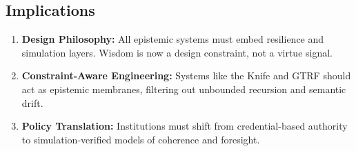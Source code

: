 \documentclass[12pt]{article}
\begin{document}
\subsection{Implications}
\begin{enumerate}
    \item \textbf{Design Philosophy:} All epistemic systems must embed resilience and simulation layers. Wisdom is now a design constraint, not a virtue signal.
    \item \textbf{Constraint-Aware Engineering:} Systems like the Knife and GTRF should act as epistemic membranes, filtering out unbounded recursion and semantic drift.
    \item \textbf{Policy Translation:} Institutions must shift from credential-based authority to simulation-verified models of coherence and foresight.
\end{enumerate}


\nocite{*}


\end{document}
